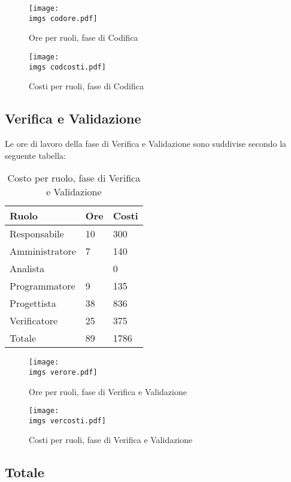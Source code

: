 {{	\begin{figure}[H]
		\centering
		\texttt{[image: \\imgs codore.pdf]}
		\label{fig:orecodifica}
		\caption{Ore per ruoli, fase di Codifica}
	\end{figure}
	\begin{figure}[H]
		\centering
		\texttt{[image: \\imgs codcosti.pdf]}
		\label{fig:costocodifica}
		\caption{Costi per ruoli, fase di Codifica}
	\end{figure}
}
\subsection{Verifica e Validazione}{
	Le ore di lavoro della fase di Verifica e Validazione sono suddivise secondo la seguente tabella:
	\begin{table}[H]
		 \centering
		 \begin{tabular}{p{}p{}
		 	  		  				p{}}
			  \toprule Ruolo & Ore  & Costi \\
			  \midrule
			  Responsabile & 10  & 300 \\
			  Amministratore & 7   & 140 \\
			  Analista &    & 0 \\
			  Programmatore & 9   & 135 \\
			  Progettista & 38  & 836 \\
			  Verificatore & 25  & 375 \\
			  Totale & 89  & 1786 \\
			  \bottomrule
		 \end{tabular}
		 \label{tab:costoverifica}
		 \caption{Costo per ruolo, fase di Verifica e Validazione}
	\end{table}
	
	\begin{figure}[H]
		\centering
		\texttt{[image: \\imgs verore.pdf]}
		\label{fig:oreverifica}
		\caption{Ore per ruoli, fase di Verifica e Validazione}
	\end{figure}
	\begin{figure}[H]
		\centering
		\texttt{[image: \\imgs vercosti.pdf]}
		\label{fig:costoverifica}
		\caption{Costi per ruoli, fase di Verifica e Validazione}
	\end{figure}
}
\subsection{Totale}{
}}
